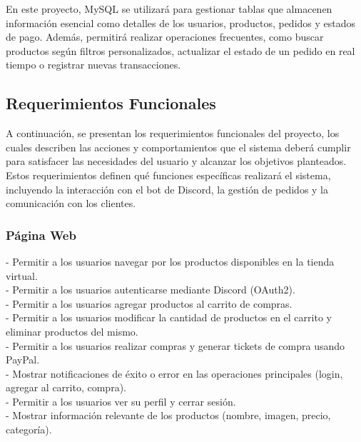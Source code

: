 \documentclass[a4paper,12pt]{article}
\begin{document}
En este proyecto, MySQL se utilizará para gestionar tablas que almacenen información esencial como detalles de los usuarios, productos, pedidos y estados de pago. Además, permitirá realizar operaciones frecuentes, como buscar productos según filtros personalizados, actualizar el estado de un pedido en real tiempo o registrar nuevas transacciones.\\
\newpage
\subsection{Requerimientos Funcionales}
A continuación, se presentan los requerimientos funcionales del proyecto, los cuales describen las acciones y comportamientos que el sistema deberá cumplir para satisfacer las necesidades del usuario y alcanzar los objetivos planteados. Estos requerimientos definen qué funciones específicas realizará el sistema, incluyendo la interacción con el bot de Discord, la gestión de pedidos y la comunicación con los clientes.\\

\subsubsection{Página Web}

- Permitir a los usuarios navegar por los productos disponibles en la tienda virtual.\\

- Permitir a los usuarios autenticarse mediante Discord (OAuth2).\\

- Permitir a los usuarios agregar productos al carrito de compras.\\

- Permitir a los usuarios modificar la cantidad de productos en el carrito y eliminar productos del mismo.\\

- Permitir a los usuarios realizar compras y generar tickets de compra usando PayPal.\\

- Mostrar notificaciones de éxito o error en las operaciones principales (login, agregar al carrito, compra).\\

- Permitir a los usuarios ver su perfil y cerrar sesión.\\

- Mostrar información relevante de los productos (nombre, imagen, precio, categoría).\\
\end{document}
